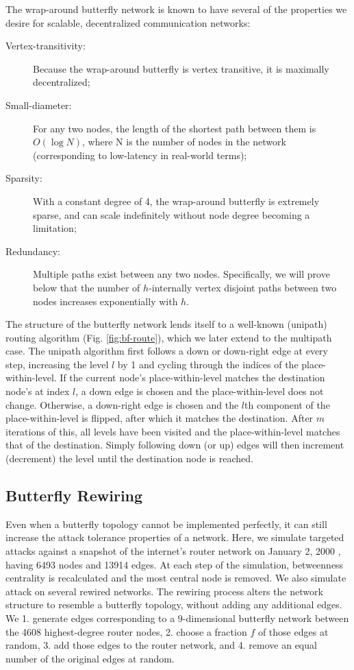 \documentclass[10pt,letterpaper]{article}
\begin{document}
The wrap-around butterfly network is known to have several of the properties
we desire for scalable, decentralized communication networks:
\begin{description}
\item[Vertex-transitivity:]
Because the wrap-around butterfly is vertex transitive,
it is maximally decentralized;
\item[Small-diameter:]
For any two nodes, the length of the shortest path between them is
$O(\log N)$, where N is the number of nodes in the network
(corresponding to low-latency in real-world terms);
\item[Sparsity:]
With a constant degree of 4, the wrap-around butterfly is extremely sparse,
and can scale indefinitely without node degree becoming a limitation;
\item [Redundancy:]
Multiple paths exist between any two nodes.
Specifically, we will prove below that the number of
$h$-internally vertex disjoint paths between two
nodes increases exponentially with $h$.
\end{description}

The structure of the butterfly network lends itself to a well-known
(unipath) routing algorithm (Fig. \ref{fig:bf-route}),
which we later extend to the multipath case.
The unipath algorithm first follows a down or down-right edge at every step,
increasing the level $l$ by 1 and cycling through the
indices of the place-within-level.
If the current node's place-within-level matches the destination node's at
index $l$,
a down edge is chosen and the place-within-level does not change.
Otherwise, a down-right edge is chosen and the $l$th component of the
place-within-level is flipped,
after which it matches the destination.
After $m$ iterations of this, all levels have been visited
and the place-within-level matches that of the destination.
Simply following down (or up) edges will then increment (decrement) the
level until the destination node is reached.

\subsection*{Butterfly Rewiring}

Even when a butterfly topology cannot be implemented perfectly,
it can still increase the attack tolerance properties of a network.
Here, we simulate targeted attacks against a snapshot of the internet's
router network on January 2, 2000
\cite{leskovec_graphs_2005}, having 6493 nodes and 13914 edges.
At each step of the simulation, betweenness centrality is recalculated and the
most central node is removed.
We also simulate attack on several rewired networks.
The rewiring process alters the network structure to resemble a butterfly
topology, without adding any additional edges.
We 1. generate edges corresponding to a 9-dimensional butterfly network between
the 4608 highest-degree router nodes,
2. choose a fraction $f$ of those edges at random,
3. add those edges to the router network, and
4. remove an equal number of the original edges at random.
\end{document}
